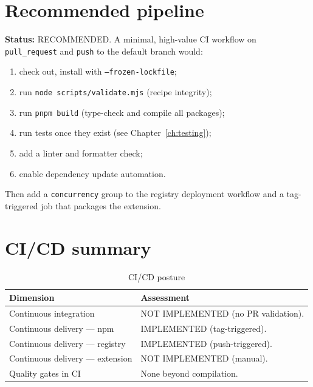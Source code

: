 \section{Recommended pipeline}

\textbf{Status:} RECOMMENDED. A minimal, high-value CI workflow on
\texttt{pull\_request} and \texttt{push} to the default branch would:

\begin{enumerate}
  \item check out, install with \texttt{--frozen-lockfile};
  \item run \texttt{node scripts/validate.mjs} (recipe integrity);
  \item run \texttt{pnpm build} (type-check and compile all packages);
  \item run tests once they exist (see Chapter~\ref{ch:testing});
  \item add a linter and formatter check;
  \item enable dependency update automation.
\end{enumerate}

Then add a \texttt{concurrency} group to the registry deployment workflow and a
tag-triggered job that packages the extension.

\section{CI/CD summary}

\begin{table}[H]
\centering
\caption{CI/CD posture}
\begin{tabular}{@{}L{4cm}L{10.2cm}@{}}
\toprule
\textbf{Dimension} & \textbf{Assessment} \\
\midrule
Continuous integration & NOT IMPLEMENTED (no PR validation). \\
Continuous delivery --- npm & IMPLEMENTED (tag-triggered). \\
Continuous delivery --- registry & IMPLEMENTED (push-triggered). \\
Continuous delivery --- extension & NOT IMPLEMENTED (manual). \\
Quality gates in CI & None beyond compilation. \\
\bottomrule
\end{tabular}
\end{table}
